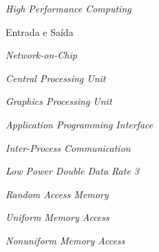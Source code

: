 
\begin{siglas}
    \item[\hpc]   \textit{High Performance Computing}
    \item[\io]    Entrada e Saída
    \item[\noc]   \textit{Network-on-Chip}
    \item[\cpu]   \textit{Central Processing Unit}
    \item[\gpu]   \textit{Graphics Processing Unit}
    \item[\api]   \textit{Application Programming Interface}
    \item[\ipc]   \textit{Inter-Process Communication}
    \item[\lpddr] \textit{Low Power Double Data Rate 3}
    \item[\ram]   \textit{Random Access Memory}
    \item[\uma]   \textit{Uniform Memory Access}
    \item[\numa]  \textit{Nonuniform Memory Access}
\end{siglas}
